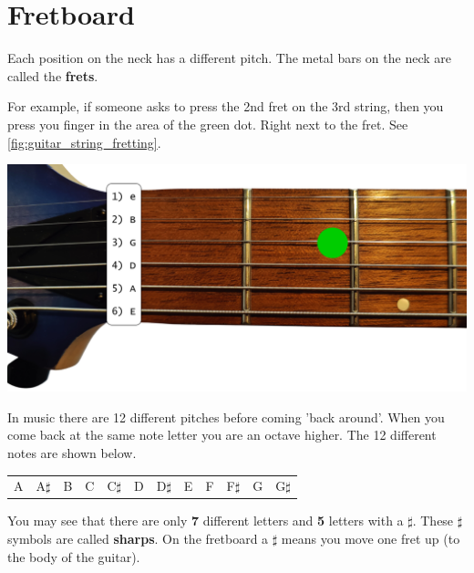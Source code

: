 \section{Fretboard}

\begin{minipage}{0.48\textwidth}
Each position on the neck has a different pitch. The metal bars on the neck are called the \textbf{frets}.

For example, if someone asks to press the 2nd fret on the 3rd string, then you press you finger in the area of the green dot. Right next to the fret. See \ref{fig:guitar_string_fretting}.
\end{minipage}
\hfill
\begin{minipage}{0.48\textwidth}
    \centering
    \includegraphics[width=\textwidth]{image/guitar-neck-fretting.png}
    \label{fig:guitar_string_fretting}
\end{minipage}

In music there are 12 different pitches before coming 'back around'. When you come back at the same note letter you are an octave higher. The 12 different notes are shown below.

\begin{table}[h]
\centering
\begin{tabular}{*{12}{P{5mm}}}
\large{A} & \large{A$\sharp$} & \large{B} & \large{C} & \large{C$\sharp$} & \large{D} & \large{D$\sharp$} & \large{E} & \large{F} & \large{F$\sharp$} & \large{G} & \large{G$\sharp$}
\end{tabular}
\end{table}

You may see that there are only \textbf{7} different letters and \textbf{5} letters with a \textbf{$\sharp$}. These $\sharp$ symbols are called \textbf{sharps}. On the fretboard a $\sharp$ means you move one fret up (to the body of the guitar).

